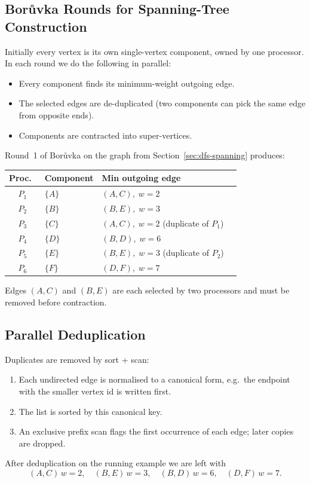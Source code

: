 \subsection{Bor{\r u}vka Rounds for Spanning-Tree Construction}

Initially every vertex is its own single-vertex component, owned by one
processor.  In each round we do the following in parallel:
\begin{itemize}
  \item Every component finds its minimum-weight outgoing edge.
  \item The selected edges are de-duplicated (two components can pick
        the same edge from opposite ends).
  \item Components are contracted into super-vertices.
\end{itemize}

\begin{ppexample}
Round~1 of Bor{\r u}vka on the graph from
Section~\ref{sec:dfs-spanning} produces:
\begin{center}
\begin{tabular}{@{}clll@{}}
\toprule
Proc.\ & Component & Min outgoing edge \\
\midrule
$P_1$ & $\{A\}$ & $(A,C),\; w=2$ \\
$P_2$ & $\{B\}$ & $(B,E),\; w=3$ \\
$P_3$ & $\{C\}$ & $(A,C),\; w=2$ \quad (duplicate of $P_1$) \\
$P_4$ & $\{D\}$ & $(B,D),\; w=6$ \\
$P_5$ & $\{E\}$ & $(B,E),\; w=3$ \quad (duplicate of $P_2$) \\
$P_6$ & $\{F\}$ & $(D,F),\; w=7$ \\
\bottomrule
\end{tabular}
\end{center}
Edges $(A,C)$ and $(B,E)$ are each selected by two processors and must
be removed before contraction.
\end{ppexample}


\subsection{Parallel Deduplication}

Duplicates are removed by sort + scan:
\begin{enumerate}
  \item Each undirected edge is normalised to a canonical form, e.g.\
        the endpoint with the smaller vertex id is written first.
  \item The list is sorted by this canonical key.
  \item An exclusive prefix scan flags the first occurrence of each
        edge; later copies are dropped.
\end{enumerate}
After deduplication on the running example we are left with
\[
  (A,C)\,w{=}2,\quad
  (B,E)\,w{=}3,\quad
  (B,D)\,w{=}6,\quad
  (D,F)\,w{=}7.
\]

